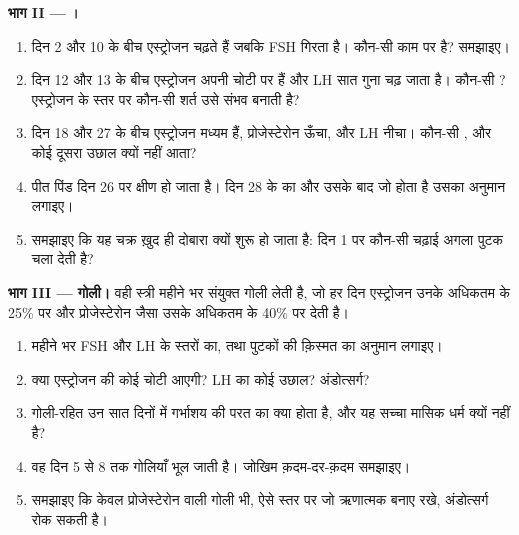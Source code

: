 \begin{problem}
\medskip
\noindent\textbf{भाग II --- ।}
\begin{enumerate}[resume]
  \item दिन 2 और 10 के बीच एस्ट्रोजन चढ़ते हैं जबकि FSH गिरता है। कौन-सी
         काम पर है? समझाइए।
  \item दिन 12 और 13 के बीच एस्ट्रोजन अपनी चोटी पर हैं और LH सात गुना चढ़
        जाता है। कौन-सी ? एस्ट्रोजन के स्तर पर कौन-सी शर्त उसे
        संभव बनाती है?
  \item दिन 18 और 27 के बीच एस्ट्रोजन मध्यम हैं, प्रोजेस्टेरोन ऊँचा, और
        LH नीचा। कौन-सी , और कोई दूसरा उछाल क्यों नहीं आता?
  \item पीत पिंड दिन 26 पर क्षीण हो जाता है। दिन 28 के  का और
        उसके बाद जो होता है उसका अनुमान लगाइए।
  \item समझाइए कि यह चक्र ख़ुद ही दोबारा क्यों शुरू हो जाता है: दिन 1 पर
        कौन-सी चढ़ाई अगला पुटक चला देती है?
\end{enumerate}

\medskip
\noindent\textbf{भाग III --- गोली।}
वही स्त्री महीने भर संयुक्त गोली लेती है, जो हर दिन एस्ट्रोजन उनके अधिकतम
के 25\% पर और प्रोजेस्टेरोन जैसा  उसके अधिकतम के 40\% पर देती है।
\begin{enumerate}[resume]
  \item महीने भर FSH और LH के स्तरों का, तथा पुटकों की क़िस्मत का अनुमान
        लगाइए।
  \item क्या एस्ट्रोजन की कोई चोटी आएगी? LH का कोई उछाल? अंडोत्सर्ग?
  \item गोली-रहित उन सात दिनों में गर्भाशय की परत का क्या होता है, और यह
        सच्चा मासिक धर्म क्यों नहीं है?
  \item वह दिन 5 से 8 तक गोलियाँ भूल जाती है। जोखिम क़दम-दर-क़दम समझाइए।
  \item समझाइए कि केवल प्रोजेस्टेरोन वाली गोली भी, ऐसे स्तर पर जो ऋणात्मक
         बनाए रखे, अंडोत्सर्ग रोक सकती है।
\end{enumerate}


\end{problem}
